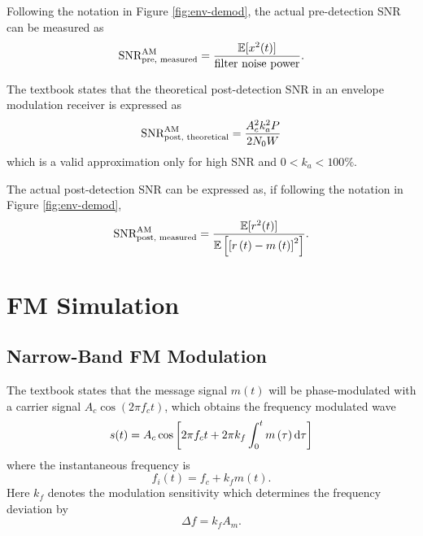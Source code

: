 \documentclass[../ECE459FinalProjectReport.tex]{subfiles}
\begin{document}
Following the notation in Figure \ref{fig:env-demod}, the actual pre-detection SNR can be measured as
\begin{equation}
    \text{SNR}_{\text{pre, measured}}^{\text{AM}} = \frac{\mathbb{E}[x^2(t)]}{\text{filter noise power}}.
\end{equation}

The textbook \cite[Eq. (9.23)]{haykinIntroductionAnalogDigital2007} states that the theoretical post-detection SNR in an envelope modulation receiver is expressed as
\begin{equation}
    \text{SNR}_{\text{post, theoretical}}^{\text{AM}} = \frac{A_c^2 k_a^2 P}{2N_0 W}
\end{equation}
which is a valid approximation only for high SNR and $0<k_a<100\%$.

The actual post-detection SNR can be expressed as, if following the notation in Figure \ref{fig:env-demod},
\begin{equation}
    \text{SNR}_{\text{post, measured}}^{\text{AM}} = \frac{\mathbb{E}[r^2(t)]}{\mathbb{E}\left[ \left[ r\left(t\right) - m\left(t\right) \right]^2 \right]}.
\end{equation}


\section{FM Simulation}
\subsection{Narrow-Band FM Modulation}
The textbook \cite[Sec. 4.1]{haykinIntroductionAnalogDigital2007} states that the message signal $m(t)$ will be phase-modulated with a carrier signal $A_c \cos\left(2\pi f_c t\right)$, which obtains the frequency modulated wave
\begin{equation}
    \label{eq:fm_modulated}
    s(t) = A_c \cos\left[ 2\pi f_c t + 2\pi k_f \int_0^{t} m\left(\tau\right) \mathrm{d}\tau \right]
\end{equation}
where the instantaneous frequency is
\begin{equation}
    f_i(t) = f_c + k_f m\left(t\right).
\end{equation}
Here $k_f$ denotes the modulation sensitivity which determines the frequency deviation by
\begin{equation}
    \Delta f = k_f A_m.
\end{equation}
\end{document}
